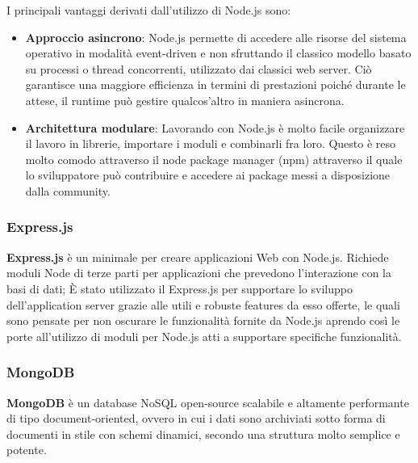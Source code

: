 I principali vantaggi derivati dall'utilizzo di Node.js sono:
\begin{itemize}
	\item \textbf{Approccio asincrono}: Node.js permette di accedere alle risorse del sistema operativo in modalità event-driven e non sfruttando il classico modello basato su processi o thread concorrenti, utilizzato dai classici web server. Ciò garantisce una maggiore efficienza in termini di prestazioni poiché durante le attese, il runtime può gestire qualcos’altro in maniera asincrona.
	\item \textbf{Architettura modulare}: Lavorando con Node.js è molto facile organizzare il lavoro in librerie, importare i moduli e combinarli fra loro. Questo è reso molto comodo attraverso il node package manager (npm) attraverso il quale lo sviluppatore può contribuire e accedere ai package messi a disposizione dalla community.
\end{itemize}

\subsubsection{Express.js}
\textbf{Express.js} è un  minimale per creare applicazioni Web con Node.js. Richiede moduli Node di terze parti per applicazioni che prevedono l’interazione con la basi di dati; \newline
\`E stato utilizzato il  Express.js per supportare lo sviluppo dell'application server grazie alle utili e robuste features da esso offerte, le quali sono pensate per non oscurare le funzionalità fornite da Node.js aprendo così le porte all'utilizzo di moduli per Node.js atti a supportare specifiche funzionalità.

\subsubsection{MongoDB}
\textbf{MongoDB} è un database NoSQL open-source scalabile e altamente performante di tipo document-oriented, ovvero in cui i dati sono archiviati sotto forma di documenti in stile  con schemi dinamici, secondo una struttura molto semplice e potente.

